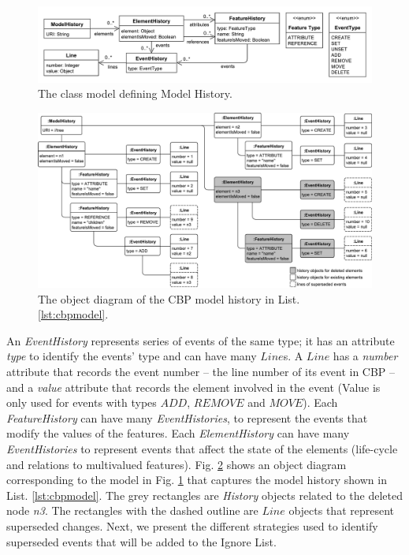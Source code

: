 \documentclass{llncs}
\begin{document}
\vspace{-20pt}    
\begin{figure}[ht]
\centering
\includegraphics[width=\linewidth]{object_history}
\caption{The class model defining Model History.}
\label{fig:object_history}
\end{figure}

\vspace{-30pt}
\begin{figure}[ht]
\centering
\includegraphics[width=\linewidth]{history_structure}
\caption{The object diagram of the CBP model history in List. \ref{lst:cbpmodel}.}
\label{fig:history_structure}
\end{figure}


An \emph{EventHistory} represents series of events of the same type; it has an attribute \emph{type} to identify the events' type and can have many \emph{$Line$}s. A \emph{$Line$} has a \emph{number} attribute that records the event number -- the line number of its event in CBP -- and a \emph{value} attribute that records the element involved in the event (Value is only used for events with types \emph{$ADD$}, \emph{$REMOVE$} and \emph{$MOVE$}). Each \emph{FeatureHistory} can have many \emph{EventHistories}, to represent the events that modify the values of the features. Each \emph{ElementHistory} can have many \emph{EventHistories} to represent events that affect the state of the elements (life-cycle and relations to multivalued features). Fig. \ref{fig:history_structure} shows an object diagram corresponding to the model in Fig. \ref{fig:object_history} that captures the model history shown in List. \ref{lst:cbpmodel}. The grey rectangles are \emph{History} objects related to the deleted node \emph{n3}. The rectangles with the dashed outline are \emph{$Line$} objects that represent superseded changes. Next, we present the different strategies used to identify superseded events that will be added to the Ignore List.   
\end{document}
